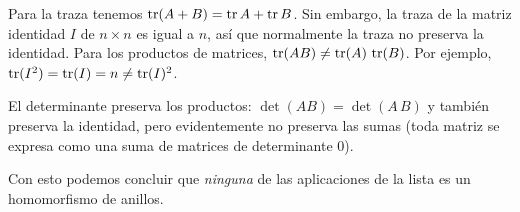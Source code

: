 \begin{ejercicio}
\begin{solucion}
    Para la traza tenemos $\operatorname{tr} (A + B) = \operatorname{tr} A + \operatorname{tr} B$. Sin embargo, la traza
    de la matriz identidad $I$ de $n\times n$ es igual a $n$, así que
    normalmente la traza no preserva la identidad. Para los productos
    de matrices, $\operatorname{tr} (AB) \ne \operatorname{tr} (A)\,\operatorname{tr} (B)$. Por ejemplo,
    $\operatorname{tr} (I^2) = \operatorname{tr} (I) = n \ne \operatorname{tr} (I)^2$.

    El determinante preserva los productos: $\det (AB) = \det (A\,B)$ y también
    preserva la identidad, pero evidentemente no preserva las sumas (toda matriz
    se expresa como una suma de matrices de determinante $0$).

    Con esto podemos concluir que \emph{ninguna} de las aplicaciones de la lista
    es un homomorfismo de anillos.
  \end{solucion}
  \fi
\end{ejercicio}


